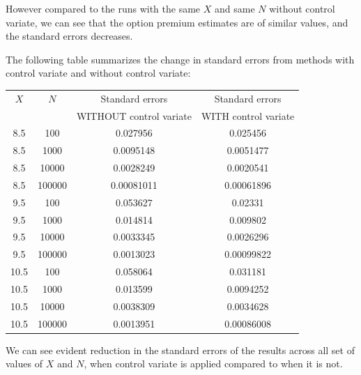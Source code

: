 However compared to the runs with the same $X$ and same $N$ without control variate, we can see that the option premium estimates are of similar values, and the standard errors decreases. 

The following table summarizes the change in standard errors from methods with control variate and without control variate:

\begin{center}
	\begin{tabular}{| c | c | c | c |}
		\hline $X$ & $N$ & Standard errors & Standard errors\\ 
		           & &WITHOUT control variate  & WITH control variate \\
		[0.5ex]
		\hline 8.5 & 100 & 0.027956 & 0.025456\\
		\hline 8.5 & 1000 & 0.0095148 & 0.0051477\\
		\hline 8.5 & 10000 & 0.0028249 & 0.0020541\\
		\hline 8.5 & 100000 & 0.00081011 & 0.00061896\\
		\hline
		\hline 9.5 & 100 & 0.053627 & 0.02331\\
		\hline 9.5 & 1000 & 0.014814 & 0.009802\\
		\hline 9.5 & 10000 & 0.0033345 & 0.0026296\\
		\hline 9.5 & 100000 & 0.0013023 & 0.00099822\\
		\hline
		\hline 10.5 & 100 & 0.058064 & 0.031181\\
		\hline 10.5 & 1000 & 0.013599 & 0.0094252\\
		\hline 10.5 & 10000 & 0.0038309 & 0.0034628\\
		\hline 10.5 & 100000 & 0.0013951 & 0.00086008\\
		\hline
	\end{tabular}
\end{center}
We can see evident reduction in the standard errors of the results across all set of values of $X$ and $N$, when control variate is applied compared to when it is not.

